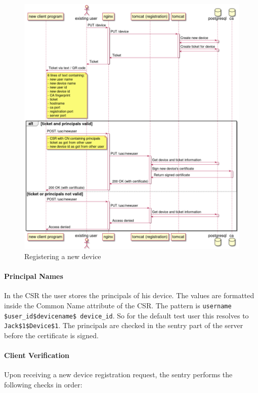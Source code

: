 \documentclass[a4paper]{memoir}
\begin{document}
\begin{figure}[!ht]
\includegraphics[width=\linewidth]{diagrams/device-registration.png}
\caption{Registering a new device}
\end{figure}

\paragraph{Principal Names}

In the CSR the user stores the principals of his device. The values are
formatted inside the Common Name attribute of the CSR. The pattern is
\texttt{username \$user\_id\$devicename\$ device\_id}. So for the default test
user this resolves to \texttt{Jack\$1\$Device\$1}. The principals are checked in
the sentry part of the server before the certificate is signed.

\paragraph{Client Verification}

Upon receiving a new device registration request, the sentry performs the
following checks in order:
\end{document}
